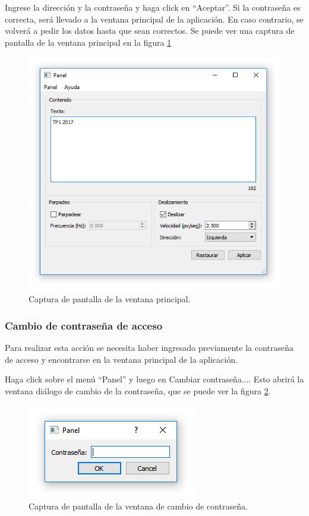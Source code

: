 Ingrese la dirección y la contraseña y haga click en \enquote{Aceptar}. Si la contraseña es correcta, será llevado a la ventana principal de la aplicación. En caso contrario, se volverá a pedir los datos hasta que sean correctos. Se puede ver una captura de pantalla de la ventana principal en la figura \ref{fig:scr-principal}

\begin{figure}[ht]
	\centering
	\includegraphics[scale=0.8]{imagenes/scr-principal.png}
	\caption{Captura de pantalla de la ventana principal.}
	\label{fig:scr-principal}
\end{figure}

\subsubsection{Cambio de contraseña de acceso}\label{sec:guia-password}
Para realizar esta acción se necesita haber ingresado previamente la contraseña de acceso y encontrarse en la ventana principal de la aplicación.

Haga click sobre el menú \enquote{Panel} y luego en {Cambiar contraseña...}. Esto abrirá la ventana diálogo de cambio de la contraseña, que se puede ver la figura \ref{fig:scr-passwd}.

\begin{figure}[ht]
	\centering
	\includegraphics[scale=0.8]{imagenes/scr-passwd.png}
	\caption{Captura de pantalla de la ventana de cambio de contraseña.}
	\label{fig:scr-passwd}
\end{figure}

